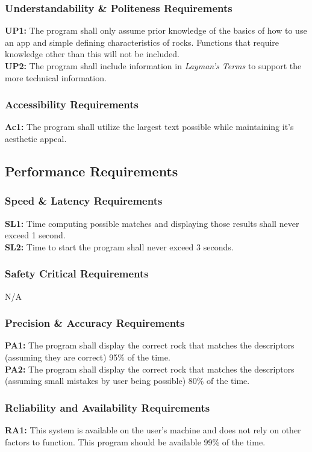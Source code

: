 \documentclass[titlepage]{article}
\begin{document}
\subsubsection{Understandability \& Politeness Requirements}
\textbf{UP1:} The program shall only assume prior knowledge of the basics of how to use an app and simple defining characteristics of rocks. Functions that require knowledge other than this will not be included.\\

\noindent\textbf{UP2:} The program shall include information in \textit{Layman's Terms} to support the more technical information.
\subsubsection{Accessibility Requirements}
\textbf{Ac1:} The program shall utilize the largest text possible while maintaining it's aesthetic appeal.\\

\subsection{Performance Requirements}
\subsubsection{Speed \& Latency Requirements}
\textbf{SL1:} Time computing possible matches and displaying those results shall never exceed 1 second.\\

\noindent\textbf{SL2:} Time to start the program shall never exceed 3 seconds.
\subsubsection{Safety Critical Requirements}
N/A
\subsubsection{Precision \& Accuracy Requirements}
\textbf{PA1:} The program shall display the correct rock that matches the descriptors (assuming they are correct) 95\% of the time.\\

\noindent\textbf{PA2:} The program shall display the correct rock that matches the descriptors (assuming small mistakes by user being possible) 80\% of the time.
\subsubsection{Reliability and Availability Requirements}
\textbf{RA1:} This system is available on the user's machine and does not rely on other factors to function. This program should be available 99\% of the time.\\
\end{document}
